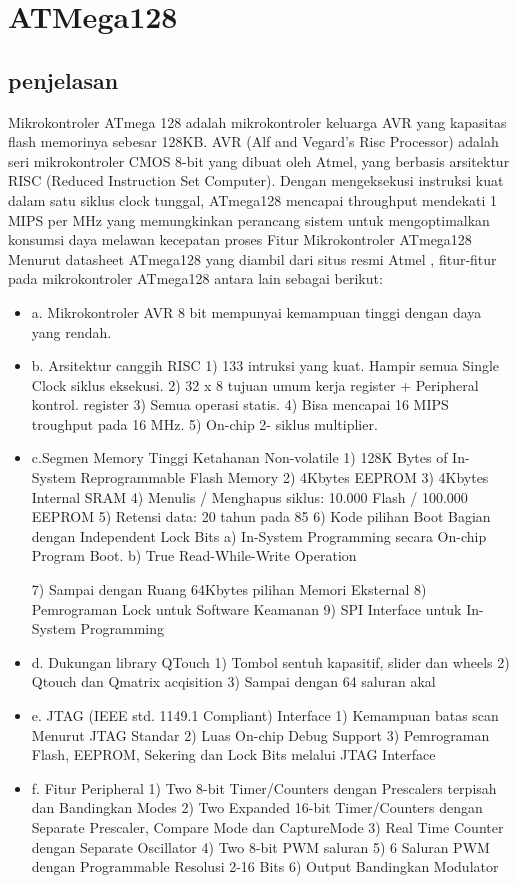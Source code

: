 \section{ATMega128}
	\subsection{penjelasan}
	Mikrokontroler ATmega 128 adalah mikrokontroler keluarga AVR yang kapasitas flash memorinya sebesar 128KB. AVR (Alf and Vegard’s Risc Processor) adalah seri mikrokontroler CMOS 8-bit yang dibuat oleh Atmel, yang berbasis arsitektur RISC (Reduced Instruction Set Computer). Dengan mengeksekusi instruksi kuat dalam satu siklus clock tunggal, ATmega128 mencapai throughput mendekati 1 MIPS per MHz yang memungkinkan perancang sistem untuk mengoptimalkan konsumsi daya melawan kecepatan proses
	Fitur Mikrokontroler ATmega128
	Menurut datasheet ATmega128 yang diambil dari situs resmi Atmel , fitur-fitur pada mikrokontroler ATmega128 antara lain sebagai berikut:
	\begin{itemize}
		\item a. Mikrokontroler AVR 8 bit mempunyai kemampuan tinggi dengan daya yang rendah. 
		\item b. Arsitektur canggih RISC
				1) 133 intruksi yang kuat. Hampir semua Single Clock siklus eksekusi.
				2) 32 x 8 tujuan umum kerja register + Peripheral kontrol. register 
				3) Semua operasi statis.
				4) Bisa mencapai 16 MIPS troughput pada 16 MHz.
				5) On-chip 2- siklus multiplier.
		\item c.Segmen Memory Tinggi Ketahanan Non-volatile 
				1) 128K Bytes of In-System Reprogrammable Flash Memory
				2) 4Kbytes EEPROM
				3) 4Kbytes Internal SRAM
				4) Menulis / Menghapus siklus: 10.000 Flash / 100.000 EEPROM 
				5) Retensi data: 20 tahun pada 85 
				6) Kode pilihan Boot Bagian dengan Independent Lock Bits 
					a) In-System Programming secara On-chip Program Boot. 
					b) True Read-While-Write Operation 
					
				7) Sampai dengan Ruang 64Kbytes pilihan Memori Eksternal
				8) Pemrograman Lock untuk Software Keamanan
				9) SPI Interface untuk In-System Programming
		\item d. Dukungan library QTouch
				1) Tombol sentuh kapasitif, slider dan wheels 
				2) Qtouch dan Qmatrix acqisition 
				3) Sampai dengan 64 saluran akal 
		\item e. JTAG (IEEE std. 1149.1 Compliant) Interface
				1) Kemampuan batas scan Menurut JTAG Standar
				2) Luas On-chip Debug Support 3) Pemrograman Flash, EEPROM, Sekering dan Lock Bits melalui  JTAG Interface
		\item f. Fitur Peripheral 
				1) Two 8-bit Timer/Counters dengan Prescalers terpisah dan Bandingkan Modes 
				2) Two Expanded 16-bit Timer/Counters dengan Separate Prescaler, Compare Mode dan CaptureMode 
				3) Real Time Counter dengan Separate Oscillator
				4) Two 8-bit PWM saluran 
				5) 6 Saluran PWM dengan Programmable Resolusi 2-16 Bits 
				6) Output Bandingkan Modulator

		\end{itemize}
		
	\cite{kioumars2011atmega}
	\cite{stankovic2008wireless}

	